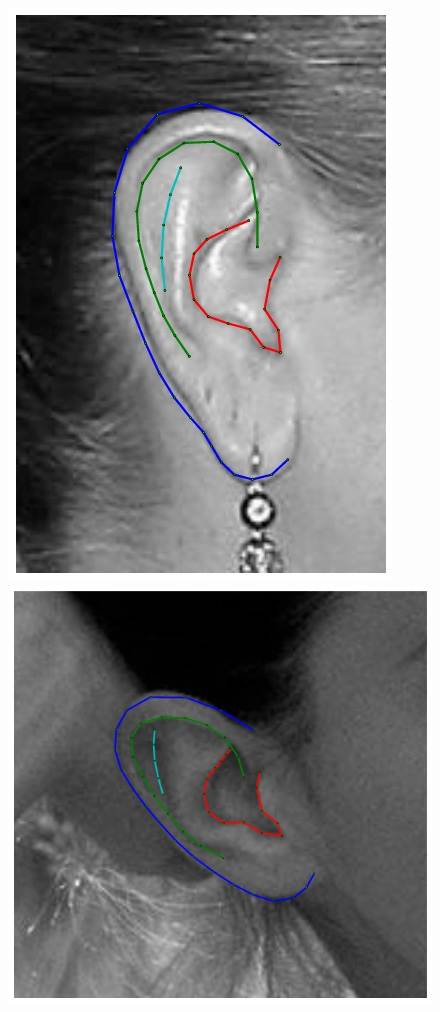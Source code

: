 \begin{figure}[!t]
    \includegraphics[height=\flowh]{resources/Ear_Deformable_Model/fittings/final_0008}
    \includegraphics[height=\flowh]{resources/Ear_Deformable_Model/fittings/final_0028}

\end{figure}

